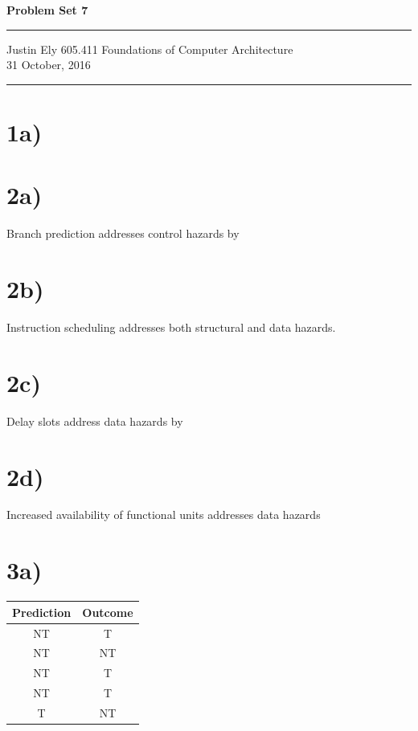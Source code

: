 \documentclass[a4paper,11pt]{article}
\begin{document}
\begin{flushright}

\vspace{1.1cm}

{\bf\Huge Problem Set 7}

\rule{0.25\linewidth}{0.5pt}

\vspace{0.5cm}
Justin Ely
\linebreak
\newline
\footnotesize{605.411 Foundations of Computer Architecture \\}
\vspace{0.5cm}
31 October, 2016
\end{flushright}

\noindent\rule{\linewidth}{1.0pt}


\section*{1a)}


\section*{2a)} 
Branch prediction addresses control hazards by


\section*{2b)}
Instruction scheduling addresses both structural and data hazards.


\section*{2c)}
Delay slots address data hazards by


\section*{2d)}
Increased availability of functional units addresses data hazards


\section*{3a)}
\begin{tabular}{| c | c |}
  \hline	
  	Prediction & Outcome \\ \hline \hline
	NT & T \\ \hline
	NT & NT \\ \hline
	NT & T \\ \hline
	NT & T \\ \hline
	T & NT \\ \hline
\end{tabular} \\
\end{document}
